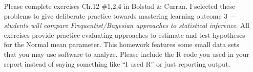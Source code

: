 \documentclass[11pt,article,landscape]{memoir}
\begin{document}
\maketitle

{\large Please complete exercises Ch.12 \#1,2,4 in Bolstad \& Curran. I selected these problems to give deliberate practice towards mastering learning outcome 3 --- \emph{students will compare Frequentist/Bayesian approaches to statistical inference}. All exercises provide practice evaluating approaches to estimate and test hypotheses for the Normal mean parameter. This homework features some small data sets that you may use software to analyze. Please include the R code you used in your report instead of saying something like ``I used R'' or just reporting output.}

\end{document}
